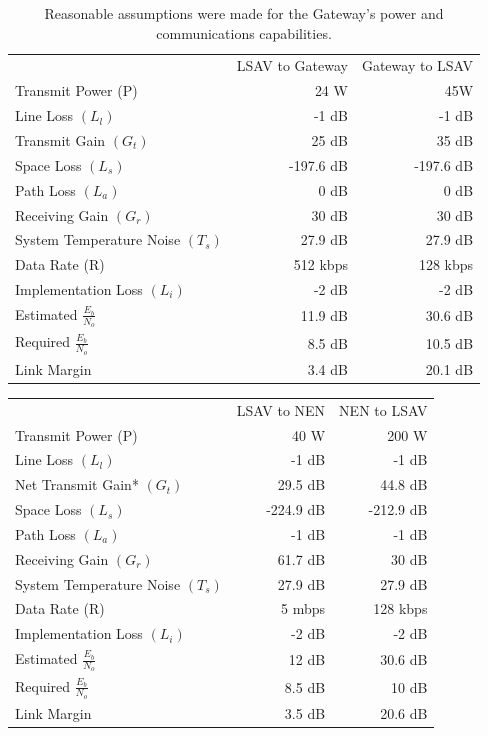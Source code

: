 \documentclass[10pt]{article}
\begin{document}
\begin{table}
  \centering
  \caption{Reasonable assumptions were made for the Gateway's power
    and communications capabilities.}
  \label{table:linkbudgetlsav}
  \begin{tabular}{lrr}
    {} & LSAV to Gateway &Gateway to LSAV \\

    Transmit Power (P)&24 W&45W \\

    Line  Loss \((L_l)\)&-1 dB&-1 dB \\
    Transmit Gain \((G_t)\)&25 dB&35 dB \\
    Space Loss \((L_s)\)&-197.6 dB&-197.6 dB \\
    Path Loss \((L_a)\)&0 dB&0 dB \\
    Receiving Gain \((G_r)\)&30 dB&30 dB \\
    System Temperature Noise \((T_s)\)&27.9 dB&27.9 dB \\
    Data Rate (R)&512 kbps&128 kbps \\
    Implementation Loss \((L_i)\)&-2 dB&-2 dB \\
    Estimated \(\frac{E_b}{N_o}\)&11.9 dB&30.6 dB \\
    Required \(\frac{E_b}{N_o}\)&8.5 dB&10.5 dB \\
    Link Margin&3.4 dB&20.1 dB \\

  \end{tabular}
\end{table}

\begin{tabular}{lrr}
  &LSAV to NEN&NEN to LSAV \\
  Transmit Power (P)&40 W&200 W \\
  Line  Loss \((L_l)\)&-1 dB&-1 dB \\
  Net Transmit Gain* \((G_t)\)&29.5 dB&44.8 dB \\
  Space Loss \((L_s)\)&-224.9 dB&-212.9 dB \\
  Path Loss \((L_a)\)&-1 dB&-1 dB \\
  Receiving Gain \((G_r)\)&61.7 dB&30 dB \\
  System Temperature Noise \((T_s)\)&27.9 dB&27.9 dB \\
  Data Rate (R)&5 mbps&128 kbps \\
  Implementation Loss \((L_i)\)&-2 dB&-2 dB \\
  Estimated \(\frac{E_b}{N_o}\)&12 dB&30.6 dB \\
  Required \(\frac{E_b}{N_o}\)&8.5 dB&10 dB \\
  Link Margin&3.5 dB&20.6 dB \\
\end{tabular}
\end{document}
